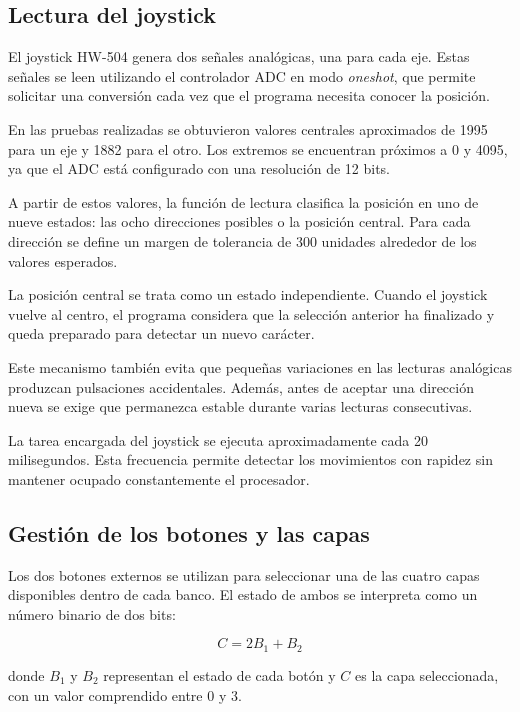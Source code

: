 \subsection{Lectura del joystick}
\label{subsec:implementacion-joystick}

El joystick HW-504 genera dos señales analógicas, una para cada eje. Estas señales se leen utilizando el controlador ADC en modo \textit{oneshot}, que permite solicitar una conversión cada vez que el programa necesita conocer la posición.

En las pruebas realizadas se obtuvieron valores centrales aproximados de 1995 para un eje y 1882 para el otro. Los extremos se encuentran próximos a 0 y 4095, ya que el ADC está configurado con una resolución de 12 bits.

A partir de estos valores, la función de lectura clasifica la posición en uno de nueve estados: las ocho direcciones posibles o la posición central. Para cada dirección se define un margen de tolerancia de 300 unidades alrededor de los valores esperados.

La posición central se trata como un estado independiente. Cuando el joystick vuelve al centro, el programa considera que la selección anterior ha finalizado y queda preparado para detectar un nuevo carácter.

Este mecanismo también evita que pequeñas variaciones en las lecturas analógicas produzcan pulsaciones accidentales. Además, antes de aceptar una dirección nueva se exige que permanezca estable durante varias lecturas consecutivas.

La tarea encargada del joystick se ejecuta aproximadamente cada 20 milisegundos. Esta frecuencia permite detectar los movimientos con rapidez sin mantener ocupado constantemente el procesador.

\subsection{Gestión de los botones y las capas}
\label{subsec:implementacion-capas}

Los dos botones externos se utilizan para seleccionar una de las cuatro capas disponibles dentro de cada banco. El estado de ambos se interpreta como un número binario de dos bits:

\begin{equation}
    C = 2B_1 + B_2
\end{equation}

donde \(B_1\) y \(B_2\) representan el estado de cada botón y \(C\) es la capa seleccionada, con un valor comprendido entre 0 y 3.

